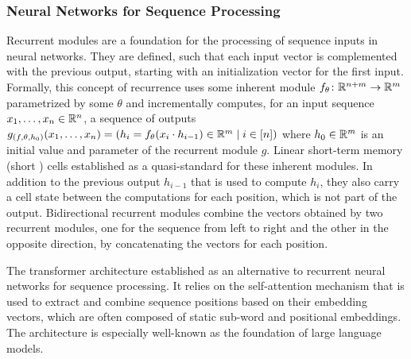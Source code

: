 \documentclass[../document.tex]{subfiles}
\begin{document}
    \subsubsection{Neural Networks for Sequence Processing}
    Recurrent modules are a foundation for the processing of sequence inputs in neural networks.
    They are defined, such that each input vector is complemented with the previous output, starting with an initialization vector for the first input.
    Formally, this concept of recurrence uses some inherent module \(f_\theta\colon \mathbb{R}^{n+m} \to \mathbb{R}^m\) parametrized by some \(\theta\) and incrementally computes, for an input sequence \(x_1, \ldots, x_n \in \mathbb{R}^n\), a sequence of outputs \(g_{(f, \theta, h_0)}(x_1, \ldots, x_n) = (h_i = f_\theta(x_i \cdot h_{i-1}) \in \mathbb{R}^m \mid i \in [n])\) where \(h_0 \in \mathbb{R}^m\) is an initial value and parameter of the recurrent module \(g\).
    Linear short-term memory (short ) cells \citep{Hoc97} established as a quasi-standard for these inherent modules.
    In addition to the previous output \(h_{i-1}\) that is used to compute \(h_i\), they also carry a cell state between the computations for each position, which is not part of the output.
    Bidirectional recurrent modules combine the vectors obtained by two recurrent modules, one for the sequence from left to right and the other in the opposite direction, by concatenating the vectors for each position.

    The transformer architecture \citep{vaswani2017attention} established as an alternative to recurrent neural networks for sequence processing.
    It relies on the self-attention mechanism that is used to extract and combine sequence positions based on their embedding vectors, which are often composed of static sub-word and positional embeddings.
    The architecture is especially well-known as the foundation of large language models.
\end{document}

